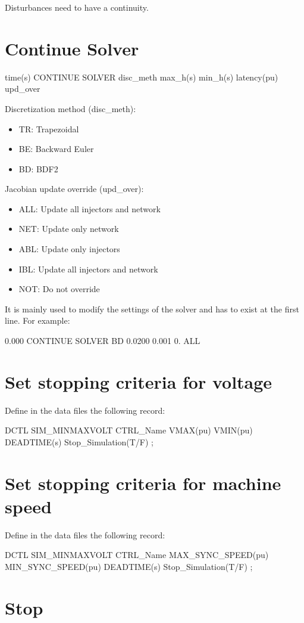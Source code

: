 Disturbances need to have a continuity.


\section{Continue Solver}

time(s) CONTINUE SOLVER disc\_meth max\_h(s)
	min\_h(s) latency(pu) upd\_over  
	
Discretization method (disc\_meth): 
\begin{itemize}
	\item TR: Trapezoidal 
	\item BE: Backward Euler 
	\item BD: BDF2 
\end{itemize}
Jacobian update override (upd\_over): 
\begin{itemize}
	\item ALL: Update all injectors and network 
	\item NET: Update only network 
	\item ABL: Update only injectors 
	\item IBL: Update all injectors and network 
	\item NOT: Do not override 
\end{itemize}
It is mainly used to modify the settings of the solver and has to
exist at the first line. For example:

0.000 CONTINUE SOLVER BD 0.0200 0.001 0. ALL


\section{Set stopping criteria for voltage}

Define in the data files the following record:

 DCTL SIM\_MINMAXVOLT CTRL\_Name VMAX(pu) VMIN(pu)
	DEADTIME(s) Stop\_Simulation(T/F) ;



\section{Set stopping criteria for machine speed}

Define in the data files the following record:

DCTL SIM\_MINMAXVOLT CTRL\_Name MAX\_SYNC\_SPEED(pu)
	MIN\_SYNC\_SPEED(pu) DEADTIME(s) Stop\_Simulation(T/F) ;


\section{Stop}

